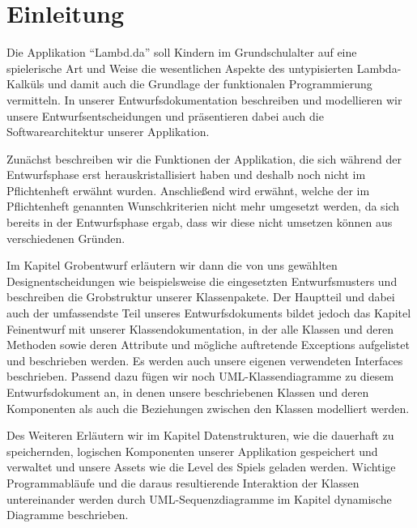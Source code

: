 \section{Einleitung}

Die Applikation "`Lambd.da"' soll Kindern im Grundschulalter auf eine spielerische Art und Weise die wesentlichen Aspekte des untypisierten Lambda-Kalküls und damit auch die Grundlage der funktionalen Programmierung vermitteln. In unserer Entwurfsdokumentation beschreiben und modellieren wir unsere Entwurfsentscheidungen und präsentieren dabei auch die Softwarearchitektur unserer Applikation.

Zunächst beschreiben wir die Funktionen der Applikation, die sich während der Entwurfsphase erst herauskristallisiert haben und deshalb noch nicht im Pflichtenheft erwähnt wurden. Anschließend wird erwähnt, welche der im Pflichtenheft genannten Wunschkriterien nicht mehr umgesetzt werden, da sich bereits in der Entwurfsphase ergab, dass wir diese nicht umsetzen können aus verschiedenen Gründen.

Im Kapitel Grobentwurf erläutern wir dann die von uns gewählten Designentscheidungen wie beispielsweise die eingesetzten Entwurfsmusters und beschreiben die Grobstruktur unserer Klassenpakete. Der Hauptteil und dabei auch der umfassendste Teil unseres Entwurfsdokuments bildet jedoch das Kapitel Feinentwurf mit unserer Klassendokumentation, in der alle Klassen und deren Methoden sowie deren Attribute und mögliche auftretende Exceptions aufgelistet und beschrieben werden. Es werden auch unsere eigenen verwendeten Interfaces beschrieben. Passend dazu fügen wir noch UML-Klassendiagramme zu diesem Entwurfsdokument an, in denen unsere beschriebenen Klassen und deren Komponenten als auch die Beziehungen zwischen den Klassen modelliert werden.

Des Weiteren Erläutern wir im Kapitel Datenstrukturen, wie die dauerhaft zu speichernden, logischen Komponenten unserer Applikation gespeichert und verwaltet und unsere Assets wie die Level des Spiels geladen werden. Wichtige Programmabläufe und die daraus resultierende Interaktion der Klassen untereinander werden durch UML-Sequenzdiagramme im Kapitel dynamische Diagramme beschrieben.